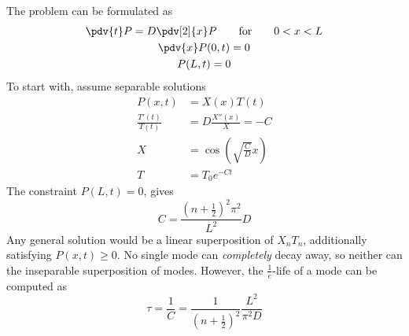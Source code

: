 \documentclass[12pt]{article}
\begin{document}
     \subsection{} The problem can be formulated as \begin{gather*}
        \pdv{t}P =  D\pdv[2]{x} P \qquad \text{for} \qquad {0<x<L}\\
        \pdv{x}P(0,t) = 0\\
        P(L,t)= 0
    \end{gather*}
    To start with, assume separable solutions \begin{align*}
        P(x,t) &=  X(x)T(t)\\
        \frac{T'(t)}{T(t)} &= D \frac{X''(x)}{X} = -C\\
        X &= \cos(\sqrt{\frac{C}{D}} x)\\
        T &= T_0 e^{ - C t}
    \end{align*}
    The constraint \(P(L,t) = 0\), gives \[
        C = \frac{(n + \frac{1}{2})^2\pi^2}{L^2}D
    \]
    Any general solution would be a linear superposition of \(X_nT_n\), additionally satisfying \(P(x,t)\geq 0\). No single mode can \emph{completely} decay away, so neither can the inseparable superposition of modes. However, the \(\frac{1}{e}\)-life of a mode can be computed as \[
        \tau = \frac{1}{C} = \frac{1}{(n + \frac{1}{2})^2}\frac{L^2}{\pi^2 D} 
    \]
\end{document}
